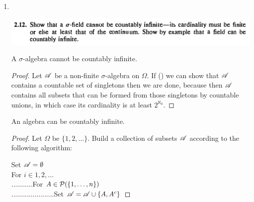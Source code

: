 \begin{enumerate}
  \newpage
\item~\\
  \begin{mdframed}
    \includegraphics[width=400pt]{img/analysis--berkeley-202a-hw-af2a.png}
  \end{mdframed}
  \begin{claim*}
    A $\sigma$-algebra cannot be countably infinite.
  \end{claim*}
  \begin{proof}
    Let $\mathscr A$ be a non-finite $\sigma$-algebra on $\Omega$. If () we can show that $\mathscr A$ contains a
    countable set of singletons then we are done, because then $\mathscr A$ contains all subsets that can be formed
    from those singletons by countable unions, in which case its cardinality is at least $2^{\aleph_0}$.
  \end{proof}


  \begin{claim*}
    An algebra can be countably infinite.
  \end{claim*}

  \begin{proof}
    Let $\Omega$ be $\{1, 2, \ldots\}$. Build a collection of subsets $\mathscr A$ according to the following algorithm:

    Set $\mathscr A = \emptyset$\\
    For $i \in 1, 2, \dots$\\
    ...........For $A \in \mathcal P(\{1, \dots, n\})$\\
    ......................Set $\mathscr A = \mathscr A \cup \{A, A^c\}$


\end{proof}
\end{enumerate}
